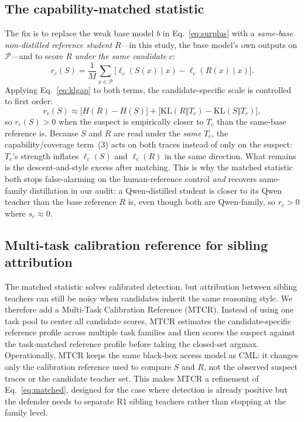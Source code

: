 \subsection{The capability-matched statistic}
\label{sec:method:matched}
The fix is to replace the weak base model $b$ in Eq.~\eqref{eq:surplus} with a
\emph{same-base non-distilled reference student} $R$---in this study, the base
model's own outputs on $\mathcal{P}$---and to score $R$ \emph{under the same
candidate} $c$:
\begin{equation}
r_c(S)=\frac{1}{M}\sum_{x\in\mathcal{P}}\big[\ell_c(S(x)\mid x)-\ell_c(R(x)\mid x)\big].
\label{eq:matched}
\end{equation}
Applying Eq.~\eqref{eq:klgap} to both terms, the candidate-specific scale is controlled
to first order:
\begin{equation}
r_c(S)\approx \big[H(R)-H(S)\big]+\big[\mathrm{KL}(R\Vert T_c)-\mathrm{KL}(S\Vert T_c)\big],
\label{eq:matcheddecomp}
\end{equation}
so $r_c(S)>0$ when the suspect is empirically closer to $T_c$ than the same-base
reference is. Because $S$ and $R$ are read under the \emph{same} $T_c$, the
capability/coverage term~(3) acts on both traces instead of only on the suspect:
$T_c$'s strength inflates $\ell_c(S)$ and $\ell_c(R)$ in the same direction. What
remains is the descent-and-style excess after matching. This is why the matched
statistic both stops false-alarming on the human-reference control \emph{and} recovers
same-family distillation in our audit: a Qwen-distilled student is closer to its Qwen
teacher than the base reference $R$ is, even though both are Qwen-family, so $r_c>0$
where $s_c\!\approx\!0$.

\subsection{Multi-task calibration reference for sibling attribution}
\label{sec:method:mtcr}
The matched statistic solves calibrated detection, but attribution between sibling
teachers can still be noisy when candidates inherit the same reasoning style. We
therefore add a Multi-Task Calibration Reference (MTCR). Instead of using one task
pool to center all candidate scores, MTCR estimates the candidate-specific reference
profile across multiple task families and then scores the suspect against the
task-matched reference profile before taking the closed-set argmax. Operationally,
MTCR keeps the same black-box access model as CML: it changes only the calibration
reference used to compare $S$ and $R$, not the observed suspect traces or the candidate
teacher set. This makes MTCR a refinement of Eq.~\eqref{eq:matched}, designed for the
case where detection is already positive but the defender needs to separate R1 sibling
teachers rather than stopping at the family level.

